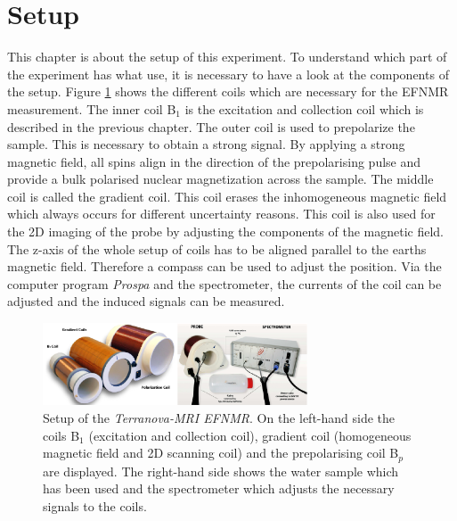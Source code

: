 \section{Setup}
\label{sec:Aufbau}
This chapter is about the setup of this experiment.
To understand which part of the experiment has what use, it is necessary to have a look at the components of the setup.\newline
Figure \ref{fig:Aufbau} shows the different coils which are necessary for the EFNMR measurement.
The inner coil B$_1$ is the excitation and collection coil which is described in the previous chapter.
The outer coil is used to prepolarize the sample.
This is necessary to obtain a strong signal.
By applying a strong magnetic field, all spins align in the direction of the prepolarising pulse and provide a bulk polarised nuclear magnetization across the sample.
The middle coil is called the gradient coil.
This coil erases the inhomogeneous magnetic field which always occurs for different uncertainty reasons.
This coil is also used for the 2D imaging of the probe by adjusting the components of the magnetic field.\newline
The z-axis of the whole setup of coils has to be aligned parallel to the earths magnetic field.
Therefore a compass can be used to adjust the position.
Via the computer program \textit{Prospa} and the spectrometer, the currents of the coil can be adjusted and the induced signals can be measured.
\begin{figure}[H]
    \centering
    \includegraphics[width= 0.7\textwidth]{Abbildungen/Aufbau.png}   
    \caption[Setup of the \textit{Terranova-MRI EFNMR}. \cite{Bild}]{Setup of the \textit{Terranova-MRI EFNMR}.
    On the left-hand side the coils B$_1$ (excitation and collection coil), gradient coil (homogeneous magnetic field and 2D scanning coil) and the prepolarising coil B$_p$ are displayed.
    The right-hand side shows the water sample which has been used and the spectrometer which adjusts the necessary signals to the coils. \cite{Bild}}
    \label{fig:Aufbau}
\end{figure}